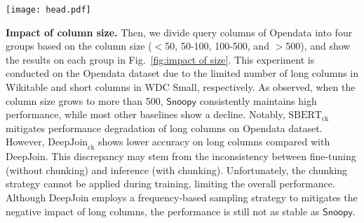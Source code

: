 \begin{figure*}
\vspace{-3mm}
\centering
\begin{minipage}{\linewidth}
    \centering
       \texttt{[image: head.pdf]}\\
       \vspace{-2mm}
  \end{minipage}
   

\vspace{-2mm}
\caption{ Effectiveness evaluation in grouping columns of different sizes on the Opendata dataset.}  
\label{fig:impact of size}
\vspace{-4mm}
\end{figure*}




\noindent \textbf{Impact of column size.}
Then, we divide query columns of Opendata into four groups based on the column size ($<$50, 50-100, 100-500, and $>$500), and show the results on each group in Fig.~\ref{fig:impact of size}. 
This experiment is conducted on the Opendata dataset due to the limited number of long columns in Wikitable and short columns in WDC Small, respectively.
As observed, when the column size grows to more than 500, $\textsf{Snoopy}$ consistently maintains high performance, while most other baselines show a decline.
Notably, $\text{SBERT}_\text{ck}$ mitigates performance degradation of long columns on Opendata dataset. However, $\text{DeepJoin}_\text{ck}$ shows lower accuracy on long columns compared with $\text{DeepJoin}$. This discrepancy may stem from the inconsistency between fine-tuning (without chunking) and inference (with chunking). Unfortunately, the chunking strategy cannot be applied during training, limiting the overall performance.
Although DeepJoin employs a frequency-based sampling strategy to mitigates the negative impact of long columns, the performance is still not as stable as $\textsf{Snoopy}$. 

